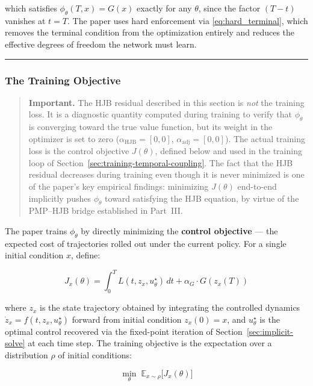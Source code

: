 \documentclass{article}
\begin{document}
which satisfies $\phi_\theta(T,x) = G(x)$ exactly for any $\theta$, since
the factor $(T-t)$ vanishes at $t=T$. The paper uses hard enforcement via
\eqref{eq:hard_terminal}, which removes the terminal condition from the
optimization entirely and reduces the effective degrees of freedom the network
must learn.

\medskip\hrule\medskip

\subsubsection{The Training Objective}

\begin{quote}
\textbf{Important.} The HJB residual described in this section is \emph{not}
the training loss. It is a diagnostic quantity computed during training to
verify that $\phi_\theta$ is converging toward the true value function, but
its weight in the optimizer is set to zero ($\alpha_{\text{HJB}} = [0,0]$,
$\alpha_{\text{adj}} = [0,0]$). The actual training loss is the control
objective $J(\theta)$, defined below and used in the training loop of
Section~\ref{sec:training-temporal-coupling}. The fact that the HJB residual
decreases during training even though it is never minimized is one of the
paper's key empirical findings: minimizing $J(\theta)$ end-to-end implicitly
pushes $\phi_\theta$ toward satisfying the HJB equation, by virtue of the
PMP--HJB bridge established in Part~III.

\end{quote}

The paper trains $\phi_\theta$ by directly minimizing the \textbf{control
objective} --- the expected cost of trajectories rolled out under the current
policy. For a single initial condition $x$, define:

\begin{equation}
    J_x(\theta) = \int_0^T L(t, z_x, u^\star_\theta)\, dt
    + \alpha_G \cdot G(z_x(T))
    \label{eq:control_objective}
\end{equation}

where $z_x$ is the state trajectory obtained by integrating the controlled
dynamics $\dot{z}_x = f(t, z_x, u^\star_\theta)$ forward from initial
condition $z_x(0) = x$, and $u^\star_\theta$ is the optimal control recovered
via the fixed-point iteration of Section~\ref{sec:implicit-solve} at each time
step. The training objective is the expectation over a distribution $\rho$ of
initial conditions:

\begin{equation}
    \min_\theta\; \mathbb{E}_{x \sim \rho}\bigl[J_x(\theta)\bigr]
    \label{eq:training_objective}
\end{equation}
\end{document}
